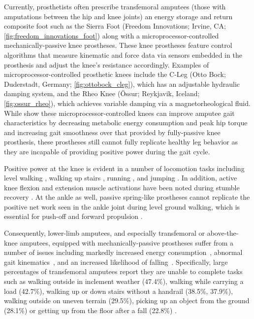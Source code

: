 Currently, prosthetists often prescribe transfemoral amputees (those with
amputations between the hip and knee joints) an energy storage and return
composite foot such as the Sierra Foot (Freedom Innovations; Irvine, CA;
\cref{fig:freedom_innovations_foot}) along with a microprocessor-controlled
mechanically-passive knee prostheses. These knee prostheses feature control
algorithms that measure kinematic and force data via sensors embedded in the
prosthesis and adjust the knee's resistance accordingly.  Examples of
microprocessor-controlled prosthetic knees include the C-Leg (Otto Bock;
Duderstadt, Germany; \cref{fig:ottobock_cleg}), which has an adjustable
hydraulic damping system, and the Rheo Knee (Össur; Reykjavik, Iceland;
\cref{fig:ossur_rheo}), which achieves variable damping via a magnetorheological
fluid. While \citet{johansson2005clinical} show these microprocessor-controlled
knees can improve amputee gait characteristics by decreasing metabolic energy
consumption and peak hip torque and increasing gait smoothness over that
provided by fully-passive knee prosthesis, these prostheses still cannot fully
replicate healthy leg behavior as they are incapable of providing positive power
during the gait cycle. 

Positive power at the knee is evident in a number of locomotion tasks including
level walking \citep{perry1992gait}, walking up stairs
\citep{nadeau2003frontal}, running \citep{buczek1990stance}, and jumping
\citep{hubley1983work}. In addition, active knee flexion and extension muscle
activations have been noted during stumble recovery \citep{eng1994strategies}.
At the ankle as well, passive spring-like prostheses cannot replicate the
positive net work seen in the ankle joint during level ground walking, which is
essential for push-off and forward propulsion \citep{perry1992gait}.

Consequently, lower-limb amputees, and especially transfemoral or above-the-knee
amputees, equipped with mechanically-passive prostheses suffer from a number of
issues including markedly increased energy consumption~\citep{waters1976energy},
abnormal gait kinematics~\citep{jaegers1995prosthetic}, and an increased
likelihood of falling~\citep{miller2001prevalence}. Specifically, large
percentages of transfemoral amputees report they are unable to complete tasks
such as walking outside in inclement weather (47.4\%), walking while carrying a
load (42.7\%), walking up or down stairs without a handrail (38.5\%, 37.9\%),
walking outside on uneven terrain (29.5\%), picking up an object from the ground
(28.1\%) or getting up from the floor after a fall (22.8\%)
\citep{gauthier1999enabling}.

